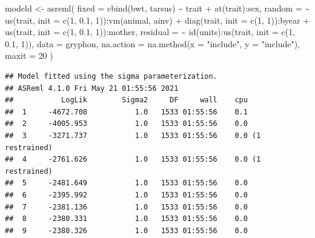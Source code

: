 \documentclass[
  12pt,
]{book}
\newenvironment{Shaded}{\begin{snugshade}}{\end{snugshade}}
\newcommand{\AttributeTok}[1]{\textcolor[rgb]{0.77,0.63,0.00}{#1}}
\newcommand{\DecValTok}[1]{\textcolor[rgb]{0.00,0.00,0.81}{#1}}
\newcommand{\FloatTok}[1]{\textcolor[rgb]{0.00,0.00,0.81}{#1}}
\newcommand{\FunctionTok}[1]{\textcolor[rgb]{0.00,0.00,0.00}{#1}}
\newcommand{\NormalTok}[1]{#1}
\newcommand{\OtherTok}[1]{\textcolor[rgb]{0.56,0.35,0.01}{#1}}
\newcommand{\SpecialCharTok}[1]{\textcolor[rgb]{0.00,0.00,0.00}{#1}}
\newcommand{\StringTok}[1]{\textcolor[rgb]{0.31,0.60,0.02}{#1}}
\begin{document}
\begin{Shaded}
\begin{Highlighting}[]
\NormalTok{modeld }\OtherTok{\textless{}{-}} \FunctionTok{asreml}\NormalTok{(}
  \AttributeTok{fixed =} \FunctionTok{cbind}\NormalTok{(bwt, tarsus) }\SpecialCharTok{\textasciitilde{}}\NormalTok{ trait }\SpecialCharTok{+} \FunctionTok{at}\NormalTok{(trait)}\SpecialCharTok{:}\NormalTok{sex,}
  \AttributeTok{random =} \SpecialCharTok{\textasciitilde{}} \FunctionTok{us}\NormalTok{(trait, }\AttributeTok{init =} \FunctionTok{c}\NormalTok{(}\DecValTok{1}\NormalTok{, }\FloatTok{0.1}\NormalTok{, }\DecValTok{1}\NormalTok{))}\SpecialCharTok{:}\FunctionTok{vm}\NormalTok{(animal, ainv) }\SpecialCharTok{+}
    \FunctionTok{diag}\NormalTok{(trait, }\AttributeTok{init =} \FunctionTok{c}\NormalTok{(}\DecValTok{1}\NormalTok{, }\DecValTok{1}\NormalTok{))}\SpecialCharTok{:}\NormalTok{byear }\SpecialCharTok{+}
    \FunctionTok{us}\NormalTok{(trait, }\AttributeTok{init =} \FunctionTok{c}\NormalTok{(}\DecValTok{1}\NormalTok{, }\FloatTok{0.1}\NormalTok{, }\DecValTok{1}\NormalTok{))}\SpecialCharTok{:}\NormalTok{mother,}
  \AttributeTok{residual =} \SpecialCharTok{\textasciitilde{}} \FunctionTok{id}\NormalTok{(units)}\SpecialCharTok{:}\FunctionTok{us}\NormalTok{(trait, }\AttributeTok{init =} \FunctionTok{c}\NormalTok{(}\DecValTok{1}\NormalTok{, }\FloatTok{0.1}\NormalTok{, }\DecValTok{1}\NormalTok{)),}
  \AttributeTok{data =}\NormalTok{ gryphon,}
  \AttributeTok{na.action =} \FunctionTok{na.method}\NormalTok{(}\AttributeTok{x =} \StringTok{"include"}\NormalTok{, }\AttributeTok{y =} \StringTok{"include"}\NormalTok{),}
  \AttributeTok{maxit =} \DecValTok{20}
\NormalTok{)}
\end{Highlighting}
\end{Shaded}

\begin{verbatim}
## Model fitted using the sigma parameterization.
## ASReml 4.1.0 Fri May 21 01:55:56 2021
##           LogLik        Sigma2     DF     wall    cpu
##  1     -4672.708           1.0   1533 01:55:56    0.1
##  2     -4005.953           1.0   1533 01:55:56    0.0
##  3     -3271.737           1.0   1533 01:55:56    0.0 (1 restrained)
##  4     -2761.626           1.0   1533 01:55:56    0.0 (1 restrained)
##  5     -2481.649           1.0   1533 01:55:56    0.0
##  6     -2395.992           1.0   1533 01:55:56    0.0
##  7     -2381.136           1.0   1533 01:55:56    0.0
##  8     -2380.331           1.0   1533 01:55:56    0.0
##  9     -2380.326           1.0   1533 01:55:56    0.0
\end{verbatim}
\end{document}
